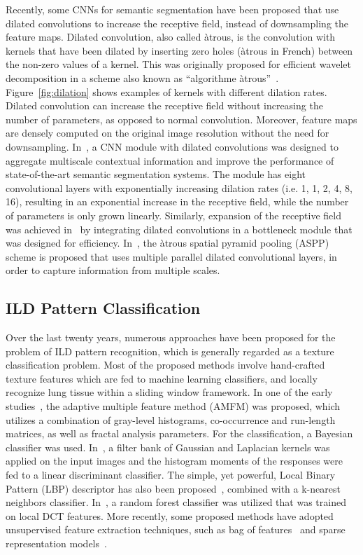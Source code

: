 \documentclass[journal]{IEEEtran}
\begin{document}
Recently, some CNNs for semantic segmentation have been proposed that use dilated convolutions to increase the receptive field, instead of downsampling the feature maps. Dilated convolution, also called \`{a}trous, is the convolution with kernels that have been dilated by inserting zero holes (\`{a}trous in French) between the non-zero values of a kernel. This was originally proposed for efficient wavelet decomposition in a scheme also known as ``algorithme \`{a}trous''~\cite{atrous}.  Figure~\ref{fig:dilation} shows examples of kernels with different dilation rates. Dilated convolution can increase the receptive field without increasing the number of parameters, as opposed to normal convolution. Moreover, feature maps are densely computed on the original image resolution without the need for downsampling. In~\cite{YuDilatedSegm}, a CNN module with dilated convolutions was designed to aggregate multiscale contextual information and improve the performance of state-of-the-art semantic segmentation systems. The module has eight convolutional layers with exponentially increasing dilation rates (i.e. 1, 1, 2, 4, 8, 16), resulting in an exponential increase in the receptive field, while the number of parameters is only grown linearly. Similarly, expansion of the receptive field was achieved in~\cite{Enet} by integrating dilated convolutions in a bottleneck module that was designed for efficiency. In~\cite{chen2016deeplab}, the \`{a}trous spatial pyramid pooling (ASPP) scheme is proposed that uses multiple parallel dilated convolutional layers, in order to capture information from multiple scales.

\subsection{ILD Pattern Classification}

Over the last twenty years, numerous approaches have been proposed for the problem of ILD pattern recognition, which is generally regarded as a texture classification problem. Most of the proposed methods involve hand-crafted texture features which are fed to machine learning classifiers, and locally recognize lung tissue within a sliding window framework. In one of the early studies~\cite{uppaluri1999computer}, the adaptive multiple feature method (AMFM) was proposed, which utilizes a combination of gray-level histograms, co-occurrence and run-length matrices, as well as fractal analysis parameters. For the classification, a Bayesian classifier was used. In~\cite{sluimer2003computer}, a filter bank of Gaussian and Laplacian kernels was applied on the input images and the histogram moments of the responses were fed to a linear discriminant classifier. The simple, yet powerful, Local Binary Pattern (LBP) descriptor has also been proposed~\cite{sorensen2010quantitative}, combined with a k-nearest neighbors classifier. In~\cite{antimopoulos2014dct}, a random forest classifier was utilized that was trained on local DCT features. More recently, some proposed methods have adopted unsupervised feature extraction techniques, such as bag of features~\cite{gangeh2010texton, foncubierta2011using} and sparse representation models~\cite{zhao2013classification, vo2011multiscale}. 
\end{document}
